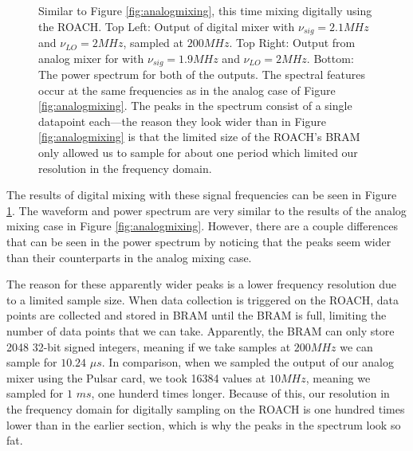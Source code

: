 \documentclass[12pt]{article}
\begin{document}
\begin{figure}[H]
\caption[SODUMB]{Similar to Figure \ref{fig:analogmixing}, this time mixing digitally using the ROACH. Top Left: Output of digital mixer with $\nu_{sig}=2.1MHz$ and $\nu_{LO}=2MHz$, sampled at $200 MHz$. Top Right: Output from analog mixer for with $\nu_{sig}=1.9MHz$ and $\nu_{LO}=2MHz$. Bottom: The power spectrum for both of the outputs. The spectral features occur at the same frequencies as in the analog case of Figure \ref{fig:analogmixing}. The peaks in the spectrum consist of a single datapoint each---the reason they look wider than in Figure \ref{fig:analogmixing} is that the limited size of the ROACH's BRAM only allowed us to sample for about one period which limited our resolution in the frequency domain.}
\label{fig:digitalmixing}
\end{figure}

The results of digital mixing with these signal frequencies can be seen in Figure \ref{fig:digitalmixing}. The waveform and power spectrum are very similar to the results of the analog mixing case in Figure \ref{fig:analogmixing}. However, there are a couple differences that can be seen in the power spectrum by noticing that the peaks seem wider than their counterparts in the analog mixing case.

The reason for these apparently wider peaks is a lower frequency resolution due to a limited sample size. When data collection is triggered on the ROACH, data points are collected and stored in BRAM until the BRAM is full, limiting the number of data points that we can take. Apparently, the BRAM can only store 2048 32-bit signed integers, meaning if we take samples at $200 MHz$ we can sample for $10.24$ $\mu s$. In comparison, when we sampled the output of our analog mixer using the Pulsar card, we took 16384 values at $10 MHz$, meaning we sampled for $1$ $ms$, one hunderd times longer. Because of this, our resolution in the frequency domain for digitally sampling on the ROACH is one hundred times lower than in the earlier section, which is why the peaks in the spectrum look so fat.
\end{document}
